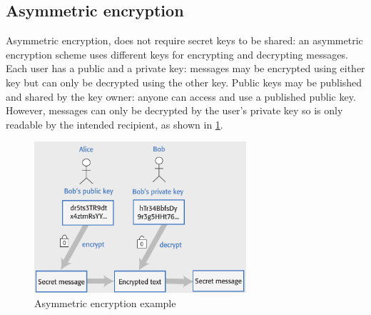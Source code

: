 \documentclass[10pt,a4paper]{report}
\begin{document}
\subsection{Asymmetric encryption}
Asymmetric encryption, does not require secret keys to be shared: an asymmetric encryption scheme uses different keys for encrypting and decrypting messages.
Each user has a public and a private key: messages may be encrypted using either key but can only be decrypted using the other key. Public keys may be published and shared by the key owner: anyone can
access and use a published public key.
However, messages can only be decrypted by the user’s private key so is only readable by the intended recipient, as shown in \ref{image90}.
\begin{figure}[h]
	\centering
	\includegraphics[width=0.7\textwidth]{image90}
	\caption{Asymmetric encryption example}
	\label{image90}
\end{figure} 
\end{document}
